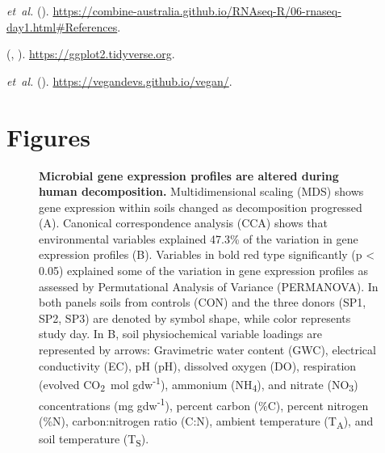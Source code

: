 \documentclass[
  sn-nature,
  lineno, referee]{sn-jnl}
\begin{document}
\begin{thebibliography}{10}
   \emph{et~al.}
  \newblock {} ().
  \newblock \urlprefix\url{https://combine-australia.github.io/RNAseq-R/06-rnaseq-day1.html#References}.
  
  \newblock \emph{}  (, ).
  \newblock \urlprefix\url{https://ggplot2.tidyverse.org}.
  
   \emph{et~al.}
  \newblock \emph{}  ().
  \newblock \urlprefix\url{https://vegandevs.github.io/vegan/}.
  
  \end{thebibliography}
  

\newpage

\section{Figures}\label{figures}

\begin{figure}[!h]
\caption{{\bf Microbial gene expression profiles are altered during human decomposition.}
Multidimensional scaling (MDS) shows gene expression within soils changed as decomposition progressed (A). Canonical correspondence analysis (CCA) shows that environmental variables explained 47.3\% of the variation in gene expression profiles (B). Variables in bold red type significantly (p < 0.05) explained some of the variation in gene expression profiles as assessed by Permutational Analysis of Variance (PERMANOVA). In both panels soils from controls (CON) and the three donors (SP1, SP2, SP3) are denoted by symbol shape, while color represents study day. In B, soil physiochemical variable loadings are represented by arrows: Gravimetric water content (GWC), electrical conductivity (EC), pH (pH), dissolved oxygen (DO), respiration (evolved CO\textsubscript{2}\ \textmu mol gdw\textsuperscript{-1}), ammonium (NH\textsubscript{4}), and nitrate (NO\textsubscript{3}) concentrations (mg gdw\textsuperscript{-1}), percent carbon (\%C), percent nitrogen (\%N), carbon:nitrogen ratio (C:N), ambient temperature (T\textsubscript{A}), and soil temperature (T\textsubscript{S}).}
\label{fig-mds}
\end{figure}
\end{document}
